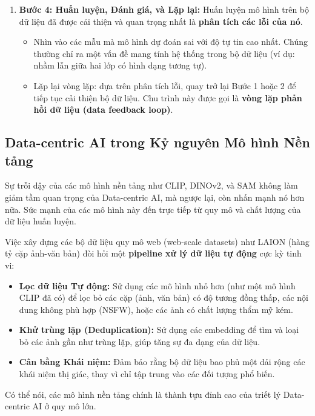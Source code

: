 \begin{enumerate}
	\item \textbf{Bước 4: Huấn luyện, Đánh giá, và Lặp lại:}
	Huấn luyện mô hình trên bộ dữ liệu đã được cải thiện và quan trọng nhất là \textbf{phân tích các lỗi của nó}.
	\begin{itemize}
		\item Nhìn vào các mẫu mà mô hình dự đoán sai với độ tự tin cao nhất. Chúng thường chỉ ra một vấn đề mang tính hệ thống trong bộ dữ liệu (ví dụ: nhầm lẫn giữa hai lớp có hình dạng tương tự).
		\item Lặp lại vòng lặp: dựa trên phân tích lỗi, quay trở lại Bước 1 hoặc 2 để tiếp tục cải thiện bộ dữ liệu. Chu trình này được gọi là \textbf{vòng lặp phản hồi dữ liệu (data feedback loop)}.
	\end{itemize}
\end{enumerate}

\subsection{Data-centric AI trong Kỷ nguyên Mô hình Nền tảng}
\label{subsec:data_centric_foundation_models}
Sự trỗi dậy của các mô hình nền tảng như CLIP, DINOv2, và SAM không làm giảm tầm quan trọng của Data-centric AI, mà ngược lại, còn nhấn mạnh nó hơn nữa. Sức mạnh của các mô hình này đến trực tiếp từ quy mô và chất lượng của dữ liệu huấn luyện.

Việc xây dựng các bộ dữ liệu quy mô web (web-scale datasets) như LAION (hàng tỷ cặp ảnh-văn bản) đòi hỏi một \textbf{pipeline xử lý dữ liệu tự động} cực kỳ tinh vi:
\begin{itemize}
	\item \textbf{Lọc dữ liệu Tự động:} Sử dụng các mô hình nhỏ hơn (như một mô hình CLIP đã có) để lọc bỏ các cặp (ảnh, văn bản) có độ tương đồng thấp, các nội dung không phù hợp (NSFW), hoặc các ảnh có chất lượng thẩm mỹ kém.
	\item \textbf{Khử trùng lặp (Deduplication):} Sử dụng các embedding để tìm và loại bỏ các ảnh gần như trùng lặp, giúp tăng sự đa dạng của dữ liệu.
	\item \textbf{Cân bằng Khái niệm:} Đảm bảo rằng bộ dữ liệu bao phủ một dải rộng các khái niệm thị giác, thay vì chỉ tập trung vào các đối tượng phổ biến.
\end{itemize}
Có thể nói, các mô hình nền tảng chính là thành tựu đỉnh cao của triết lý Data-centric AI ở quy mô lớn.


